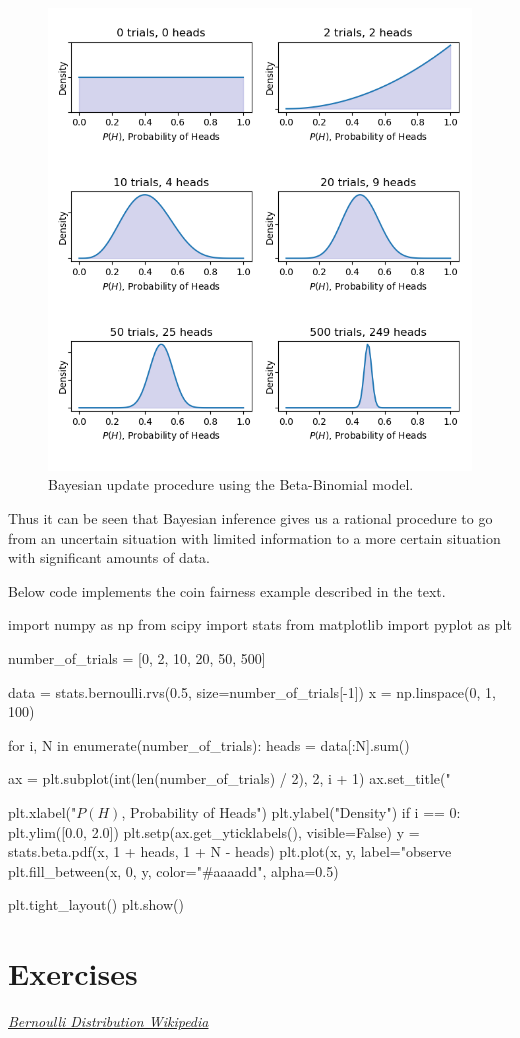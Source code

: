 \begin{figure}[htb]
  \centering
  \includegraphics[width=.7\textwidth]{figures/bayes}
  \caption{Bayesian update procedure using the Beta-Binomial model.}
  \label{fig:bayes}
\end{figure}

Thus it can be seen that Bayesian inference gives us a rational procedure to go from an uncertain situation with limited information to a more certain situation with significant amounts of data.

\begin{finmarkets}
Below code implements the coin fairness example described in the text.
\end{finmarkets}

\begin{ipython}
import numpy as np
from scipy import stats
from matplotlib import pyplot as plt

number_of_trials = [0, 2, 10, 20, 50, 500]

data = stats.bernoulli.rvs(0.5, size=number_of_trials[-1])
x = np.linspace(0, 1, 100)

for i, N in enumerate(number_of_trials):
    heads = data[:N].sum()

    ax = plt.subplot(int(len(number_of_trials) / 2), 2, i + 1)
    ax.set_title("%
	
    plt.xlabel("$P(H)$, Probability of Heads")
    plt.ylabel("Density")
    if i == 0:
        plt.ylim([0.0, 2.0])
    plt.setp(ax.get_yticklabels(), visible=False)	
    y = stats.beta.pdf(x, 1 + heads, 1 + N - heads)
    plt.plot(x, y, label="observe %
    plt.fill_between(x, 0, y, color="#aaaadd", alpha=0.5)
    
plt.tight_layout()
plt.show()
\end{ipython}

\section*{Exercises}
%

\begin{thebibliography}{9}
\href{https://en.wikipedia.org/wiki/Bernoulli_distribution}{\emph{Bernoulli Distribution Wikipedia}}
\end{thebibliography}









